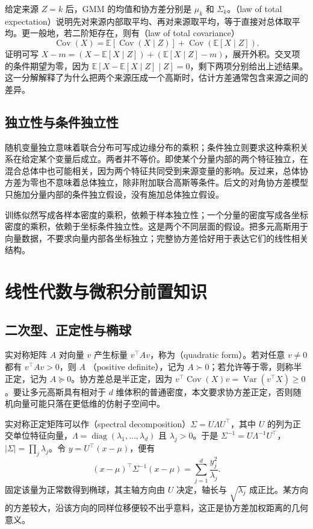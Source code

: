 \documentclass[UTF8]{ctexart}
\begin{document}
给定来源 $Z=k$ 后，GMM 的均值和协方差分别是 $\mu_k$ 和 $\Sigma_k$。（law of total expectation）说明先对来源内部取平均、再对来源取平均，等于直接对总体取平均。更一般地，若二阶矩存在，则有（law of total covariance）
\begin{equation}
\operatorname{Cov}(X)=\mathbb E[\operatorname{Cov}(X\mid Z)]
+\operatorname{Cov}(\mathbb E[X\mid Z]).
\label{eq:gmm-total-covariance}
\end{equation}
证明可写 $X-m=(X-\mathbb E[X\mid Z])+(\mathbb E[X\mid Z]-m)$，展开外积。交叉项的条件期望为零，因为 $\mathbb E[X-\mathbb E[X\mid Z]\mid Z]=0$，剩下两项分别给出上述结果。这一分解解释了为什么把两个来源压成一个高斯时，估计方差通常包含来源之间的差异。

\subsection{独立性与条件独立性}
随机变量独立意味着联合分布可写成边缘分布的乘积；条件独立则要求这种乘积关系在给定某个变量后成立。两者并不等价。即使某个分量内部的两个特征独立，在混合总体中也可能相关，因为两个特征共同受到来源变量的影响。反过来，总体协方差为零也不意味着总体独立，除非附加联合高斯等条件。后文的对角协方差模型只施加分量内部的条件独立假设，没有施加总体独立假设。

训练似然写成各样本密度的乘积，依赖于样本独立性；一个分量的密度写成各坐标密度的乘积，依赖于坐标条件独立性。这是两个不同层面的假设。把多元高斯用于向量数据，不要求向量内部各坐标独立；完整协方差恰好用于表达它们的线性相关结构。

\section{线性代数与微积分前置知识}
\label{sec:gmm-linear-algebra}

\subsection{二次型、正定性与椭球}
实对称矩阵 $A$ 对向量 $v$ 产生标量 $v^\top Av$，称为（quadratic form）。若对任意 $v\neq0$ 都有 $v^\top Av>0$，则 $A$ （positive definite），记为 $A\succ0$；若允许等于零，则称半正定，记为 $A\succeq0$。协方差总是半正定，因为 $v^\top\operatorname{Cov}(X)v=\operatorname{Var}(v^\top X)\geq0$。要让多元高斯具有相对于 $d$ 维体积的普通密度，本文要求协方差正定，否则随机向量可能只落在更低维的仿射子空间中。

实对称正定矩阵可以作（spectral decomposition）$\Sigma=U\Lambda U^\top$，其中 $U$ 的列为正交单位特征向量，$\Lambda=\operatorname{diag}(\lambda_1,\ldots,\lambda_d)$ 且 $\lambda_j>0$。于是 $\Sigma^{-1}=U\Lambda^{-1}U^\top$，$|\Sigma|=\prod_j\lambda_j$。令 $y=U^\top(x-\mu)$，便有
\begin{equation}
(x-\mu)^\top\Sigma^{-1}(x-\mu)=\sum_{j=1}^d\frac{y_j^2}{\lambda_j}.
\label{eq:gmm-quadratic-form}
\end{equation}
固定该量为正常数得到椭球，其主轴方向由 $U$ 决定，轴长与 $\sqrt{\lambda_j}$ 成正比。某方向的方差较大，沿该方向的同样位移便较不出乎意料，这正是协方差加权距离的几何意义。
\end{document}
